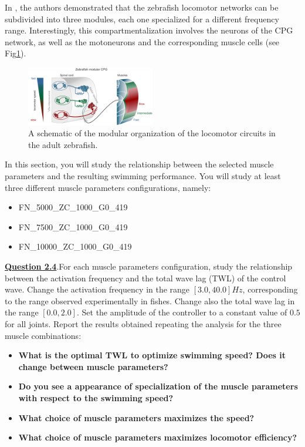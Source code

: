 \documentclass{cmc}
\begin{document}
In \cite{ampatzis2014separate}, the authors demonstrated that the zebrafish locomotor networks can be subdivided into three modules, each one specialized for a different frequency range. Interestingly, this compartmentalization involves the neurons of the CPG network, as well as the motoneurons and the corresponding muscle cells \cite{grillner2019current} (see Fig\ref{fig:speed_modules}).

\begin{figure}[H]
  \centering \includegraphics[width=0.5\textwidth]{figures/zebrafish_modular_network.png}
  \caption{\label{fig:speed_modules} A schematic of the modular organization of the locomotor circuits in the adult zebrafish.}
\end{figure}

In this section, you will study the relationship between the selected muscle parameters and the resulting swimming performance.
You will study at least three different muscle parameters configurations, namely:
\begin{itemize}
    \item FN\_5000\_ZC\_1000\_G0\_419
    \item FN\_7500\_ZC\_1000\_G0\_419
    \item FN\_10000\_ZC\_1000\_G0\_419
\end{itemize}

\textbf{\underline{Question 2.4}}.For each muscle parameters configuration, study the relationship between the activation frequency and the total wave lag (TWL) of the control wave. Change the activation frequency in the range $[3.0, 40.0] Hz$, corresponding to the range observed experimentally in fishes. Change also the total wave lag in the range $[0.0, 2.0]$. Set the amplitude of the controller to a constant value of $0.5$ for all joints. Report the results obtained repeating the analysis for the three muscle combinations:

\begin{itemize}
    \item \textbf{What is the optimal TWL to optimize swimming speed? Does it change between muscle parameters? }
    \item \textbf{Do you see a appearance of specialization of the muscle parameters with respect to the swimming speed?}
    \item \textbf{What choice of muscle parameters maximizes the speed?}
    \item \textbf{What choice of muscle parameters maximizes locomotor efficiency?}
\end{itemize}
\end{document}
